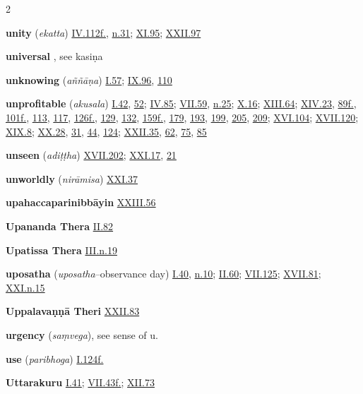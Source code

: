 \begin{multicols}{2}
\begin{vismHanging}
\par\textbf{unity} (\emph{ekatta}) \hyperlink{IV.112}{IV.112f.}{}, \hyperlink{IV.n31}{n.31}{}; \hyperlink{XI.95}{XI.95}{}; \hyperlink{XXII.97}{XXII.97}{}
\par\textbf{universal} , see kasiṇa
\par\textbf{unknowing} (\emph{aññāṇa}) \hyperlink{I.57}{I.57}{}; \hyperlink{IX.96}{IX.96}{}, \hyperlink{IX.110}{110}{}
\par\textbf{unprofitable} (\emph{akusala}) \hyperlink{I.42}{I.42}{}, \hyperlink{I.52}{52}{}; \hyperlink{IV.85}{IV.85}{}; \hyperlink{VII.59}{VII.59}{}, \hyperlink{VII.n25}{n.25}{}; \hyperlink{X.16}{X.16}{}; \hyperlink{XIII.64}{XIII.64}{}; \hyperlink{XIV.23}{XIV.23}{}, \hyperlink{XIV.89}{89f.}{}, \hyperlink{XIV.101}{101f.}{}, \hyperlink{XIV.113}{113}{}, \hyperlink{XIV.117}{117}{}, \hyperlink{XIV.126}{126f.}{}, \hyperlink{XIV.129}{129}{}, \hyperlink{XIV.132}{132}{}, \hyperlink{XIV.159}{159f.}{}, \hyperlink{XIV.179}{179}{}, \hyperlink{XIV.193}{193}{}, \hyperlink{XIV.199}{199}{}, \hyperlink{XIV.205}{205}{}, \hyperlink{XIV.209}{209}{}; \hyperlink{XVI.104}{XVI.104}{}; \hyperlink{XVII.120}{XVII.120}{}; \hyperlink{XIX.8}{XIX.8}{}; \hyperlink{XX.28}{XX.28}{}, \hyperlink{XX.31}{31}{}, \hyperlink{XX.44}{44}{}, \hyperlink{XX.124}{124}{}; \hyperlink{XXII.35}{XXII.35}{}, \hyperlink{XXII.62}{62}{}, \hyperlink{XXII.75}{75}{}, \hyperlink{XXII.85}{85}{}
\par\textbf{unseen} (\emph{adiṭṭha}) \hyperlink{XVII.202}{XVII.202}{}; \hyperlink{XXI.17}{XXI.17}{}, \hyperlink{XXI.21}{21}{}
\par\textbf{unworldly} (\emph{nirāmisa}) \hyperlink{XXI.37}{XXI.37}{}
\par\textbf{upahaccaparinibbāyin} \hyperlink{XXIII.56}{XXIII.56}{}
\par\textbf{Upananda Thera} \hyperlink{II.82}{II.82}{}
\par\textbf{Upatissa Thera} \hyperlink{III.n19}{III.n.19}{}
\par\textbf{uposatha} (\emph{uposatha}–observance day) \hyperlink{I.40}{I.40}{}, \hyperlink{I.n10}{n.10}{}; \hyperlink{II.60}{II.60}{}; \hyperlink{VII.125}{VII.125}{}; \hyperlink{XVII.81}{XVII.81}{}; \hyperlink{XXI.n15}{XXI.n.15}{}
\par\textbf{Uppalavaṇṇā Theri} \hyperlink{XXII.83}{XXII.83}{}
\par\textbf{urgency} (\emph{saṃvega}), see sense of u. 
\par\textbf{use} (\emph{paribhoga}) \hyperlink{I.124}{I.124f.}{}
\par\textbf{Uttarakuru} \hyperlink{I.41}{I.41}{}; \hyperlink{VII.43}{VII.43f.}{}; \hyperlink{XII.73}{XII.73}{}

\end{vismHanging}
\end{multicols}
